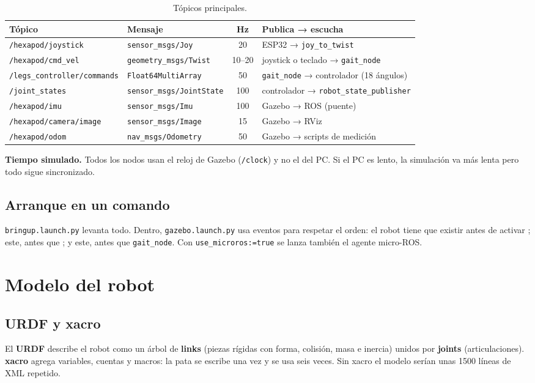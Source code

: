 \documentclass[11pt,a4paper]{article}
\newcommand{\seccion}[1]{\Needspace{18\baselineskip}\section{#1}}
\newcommand{\subsec}[1]{\Needspace{9\baselineskip}\subsection{#1}}
\begin{document}
\begin{table}[H]\centering\small
\caption{Tópicos principales.}\label{tab:topicos}
\begin{tabularx}{\linewidth}{@{}>{\ttfamily\footnotesize}l>{\ttfamily\footnotesize}lcY@{}}
\toprule
\textbf{Tópico} & \textbf{Mensaje} & \textbf{Hz} & \textbf{Publica → escucha}\\\midrule
\texttt{/hexapod/joystick} & \texttt{sensor\_msgs/Joy} & 20 & ESP32 → \texttt{joy\_to\_twist}\\
\texttt{/hexapod/cmd\_vel} & \texttt{geometry\_msgs/Twist} & 10--20 & joystick o teclado → \texttt{gait\_node}\\
\texttt{/legs\_controller/commands} & \texttt{Float64MultiArray} & 50 & \texttt{gait\_node} → controlador (18 ángulos)\\
\texttt{/joint\_states} & \texttt{sensor\_msgs/JointState} & 100 & controlador → \texttt{robot\_state\_publisher}\\
\texttt{/hexapod/imu} & \texttt{sensor\_msgs/Imu} & 100 & Gazebo → ROS (puente)\\
\texttt{/hexapod/camera/image} & \texttt{sensor\_msgs/Image} & 15 & Gazebo → RViz\\
\texttt{/hexapod/odom} & \texttt{nav\_msgs/Odometry} & 50 & Gazebo → scripts de medición\\
\bottomrule
\end{tabularx}
\end{table}

\textbf{Tiempo simulado.} Todos los nodos usan el reloj de Gazebo
(\texttt{/clock}) y no el del PC. Si el PC es lento, la simulación va más
lenta pero todo sigue sincronizado.

\subsec{Arranque en un comando}

\texttt{bringup.launch.py} levanta todo. Dentro, \texttt{gazebo.launch.py}
usa eventos para respetar el orden: el robot tiene que existir antes de
activar ; este, antes que
; y este, antes que \texttt{gait\_node}. Con
\texttt{use\_microros:=true} se lanza también el agente micro-ROS.

\seccion{Modelo del robot}

\subsec{URDF y xacro}

El \textbf{URDF} describe el robot como un árbol de \textbf{links} (piezas
rígidas con forma, colisión, masa e inercia) unidos por \textbf{joints}
(articulaciones). \textbf{xacro} agrega variables, cuentas y macros: la pata
se escribe una vez y se usa seis veces. Sin xacro el modelo serían unas
1500 líneas de XML repetido.
\end{document}
